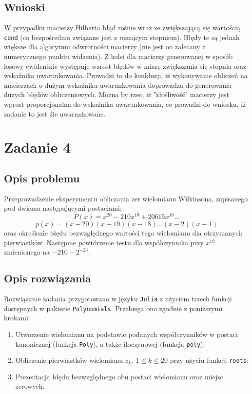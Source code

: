\documentclass{classrep}
\begin{document}
	\subsection{Wnioski}
		W przypadku macierzy Hilberta błąd rośnie wraz ze zwiększającą się wartością \texttt{cond} (co bezpośrednio związane jest z rosnącym stopniem). Błędy te są jednak większe dla algorytmu odwrotności macierzy (nie jest on zalecany z numerycznego punktu widzenia).	Z kolei dla macierzy generowanej w sposób losowy ewidentnie występuje wzrost błędów w miarę zwiększania się stopnia oraz wskaźnika uwarunkowania. Prowadzi to do konkluzji, iż wykonywanie obliczeń na macierzach o dużym wskaźniku uwarunkowania doprowadza do generowania dużych błędów obliczeniowych. Można by rzec, iż "złośliwość" macierzy jest wprost proporcjonalna do wskaźnika uwarunkowania, co prowadzi do wniosku, iż zadanie to jest źle uwarunkowane.
\section{Zadanie 4}
	\subsection{Opis problemu}
		Przeprowadzenie eksperymentu obliczania zer wielomianu Wilkinsona, zapisanego pod dwiema następującymi postaciami:
		$$P(x) = x^{20}-210x^{19}+20615x^{18} \dots $$
		$$p(x) = (x-20)(x-19)(x-18)\dots (x-2)(x-1)$$
		oraz określenie błędu bezwzględnego wartości tego wielomianu dla otrzymanych pierwiastków.
		Następnie powtórzenie testu dla współczynnika przy $x^{19}$ zmienionego na $-210-2^{-23}$.
	\subsection{Opis rozwiązania}
		Rozwiązanie zadania przygotowano w języku \texttt{Julia} z użyciem trzech funkcji dostępnych w pakiecie \texttt{Polynomials}. Przebiega ono zgodnie z poniższymi krokami:
		\begin{enumerate}[1.]
			\item Utworzenie wielomianu na podstawie podanych współczynników w postaci kanonicznej (funkcja \texttt{Poly}), a także iloczynowej (funkcja \texttt{poly});
			\item Obliczenie pierwiastków wielomianu $z_k, ~ 1 \le k \le 20$ przy użyciu funkcji \texttt{roots};
			\item Prezentacja błędu bezwzględnego obu postaci wielomianu oraz miejsc zerowych.
		\end{enumerate}
\end{document}
